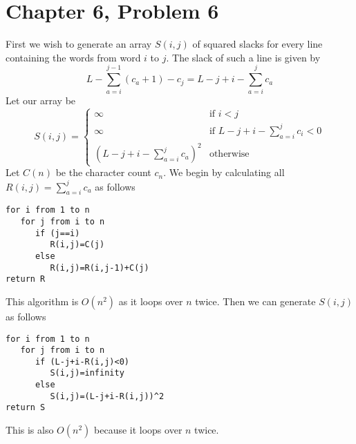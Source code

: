 \documentclass[12pt]{article}
\begin{document}
\pagebreak

\section*{Chapter 6, Problem 6}

First we wish to generate an array \(S(i,j)\) of squared slacks for every line containing the words from word \(i\) to \(j\).
The slack of such a line is given by
\[L-\sum_{a=i}^{j-1}(c_a+1)-c_j=L-j+i-\sum_{a=i}^{j}c_a\]
Let our array be
\[S(i,j)=\begin{cases}
        \infty & \text{if } i<j\\
        \infty & \text{if } L-j+i-\sum_{a=i}^{j}c_i<0\\
        (L-j+i-\sum_{a=i}^{j}c_a)^2 & \text{otherwise}
\end{cases}\]
Let \(C(n)\) be the character count \(c_n\). We begin by calculating all \(R(i,j)=\sum_{a=i}^{j}c_a\) as follows
\begin{verbatim}
for i from 1 to n
   for j from i to n
      if (j==i)
         R(i,j)=C(j)
      else
         R(i,j)=R(i,j-1)+C(j)
return R
\end{verbatim}
This algorithm is \(O(n^2)\) as it loops over \(n\) twice. Then we can generate \(S(i,j)\) as follows
\begin{verbatim}
for i from 1 to n
   for j from i to n
      if (L-j+i-R(i,j)<0)
         S(i,j)=infinity
      else
         S(i,j)=(L-j+i-R(i,j))^2
return S
\end{verbatim}
This is also \(O(n^2)\) because it loops over \(n\) twice.
\end{document}
